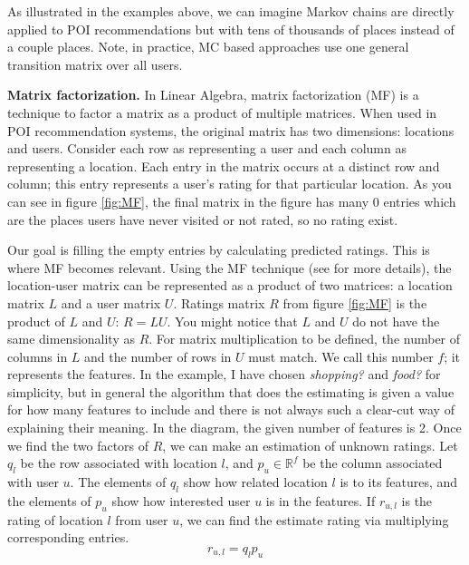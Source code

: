 \documentclass{sig-alternate}
\begin{document}
As illustrated in the examples above, we can imagine Markov chains are directly applied to 
POI recommendations but with tens of thousands of places instead of a couple places. Note, in practice, MC based 
approaches use one general transition matrix over all users.

\textbf{Matrix factorization.} In Linear Algebra, matrix factorization (MF) is a technique to 
factor a matrix as a product of multiple matrices. When used in POI recommendation systems, 
the original matrix has two dimensions: locations and users. Consider each row as representing a user and each column 
as representing a location. Each entry in the matrix occurs at a distinct row and column; this entry represents a user's rating 
for that particular location. As you can see in figure \ref{fig:MF}, the final matrix in the figure
has many 0 entries which are the places users have never visited or not rated, so no rating exist. 

Our goal is filling the empty entries by calculating predicted ratings. This is where MF becomes
relevant. Using the MF technique (see \cite{Koren:2009} for more details), the location-user matrix can be represented as a product of two matrices: 
a location matrix $L$ and a user matrix $U$. Ratings matrix $R$ from figure \ref{fig:MF} is the product of $L$ and $U$:  $R = L U$. 
You might notice that $L$ and $U$ do not have the same dimensionality as $R$. For matrix multiplication to be defined, the number of columns in $L$ and the number of rows in $U$ must match.  
We call this number $f$; it represents the features. In the example, I have chosen  \emph{shopping?} and  \emph{food?} for simplicity, 
but in general the algorithm that does the estimating is given a value for how many features to include and there is not always such a clear-cut way of explaining their meaning. In the diagram, the given number of features is 2. Once we find the two 
factors of $R$, we can make an estimation of unknown ratings. Let $q_l$ be the row associated with location $l$, and 
$p_u \in \mathbb{R}^f$ be the column associated with user $u$. The elements of $q_l$ show how related location $l$ is to its features, 
and the elements of $p_u$ show how interested user $u$ is in the features. If $r_{u,l}$ is the rating of location $l$ 
from user $u$, we can find the estimate rating via multiplying corresponding entries. ~\cite{Koren:2009}
\begin{equation}
	r_{u,l}= q_l p_u
\label{eq:MF}
\end{equation}
\end{document}
